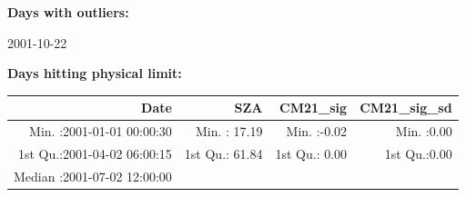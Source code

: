 \documentclass[
  10pt,
  a4paper,oneside]{article}
\begin{document}
\normalsize

\textbf{Days with outliers:}

2001-10-22

\textbf{Days hitting physical limit:}

\footnotesize

\begin{longtable}[]{@{}rrrr@{}}
\toprule
\begin{minipage}[b]{0.34\columnwidth}\raggedleft
Date\strut
\end{minipage} & \begin{minipage}[b]{0.19\columnwidth}\raggedleft
SZA\strut
\end{minipage} & \begin{minipage}[b]{0.18\columnwidth}\raggedleft
CM21\_sig\strut
\end{minipage} & \begin{minipage}[b]{0.18\columnwidth}\raggedleft
CM21\_sig\_sd\strut
\end{minipage}\tabularnewline
\midrule
\endhead
\begin{minipage}[t]{0.34\columnwidth}\raggedleft
Min. :2001-01-01 00:00:30\strut
\end{minipage} & \begin{minipage}[t]{0.19\columnwidth}\raggedleft
Min. : 17.19\strut
\end{minipage} & \begin{minipage}[t]{0.18\columnwidth}\raggedleft
Min. :-0.02\strut
\end{minipage} & \begin{minipage}[t]{0.18\columnwidth}\raggedleft
Min. :0.00\strut
\end{minipage}\tabularnewline
\begin{minipage}[t]{0.34\columnwidth}\raggedleft
1st Qu.:2001-04-02 06:00:15\strut
\end{minipage} & \begin{minipage}[t]{0.19\columnwidth}\raggedleft
1st Qu.: 61.84\strut
\end{minipage} & \begin{minipage}[t]{0.18\columnwidth}\raggedleft
1st Qu.: 0.00\strut
\end{minipage} & \begin{minipage}[t]{0.18\columnwidth}\raggedleft
1st Qu.:0.00\strut
\end{minipage}\tabularnewline
\begin{minipage}[t]{0.34\columnwidth}\raggedleft
Median :2001-07-02 12:00:00\strut
\end{minipage} & \begin{minipage}[t]{0.19\columnwidth}\raggedleft

\end{minipage}
\end{longtable}
\end{document}
